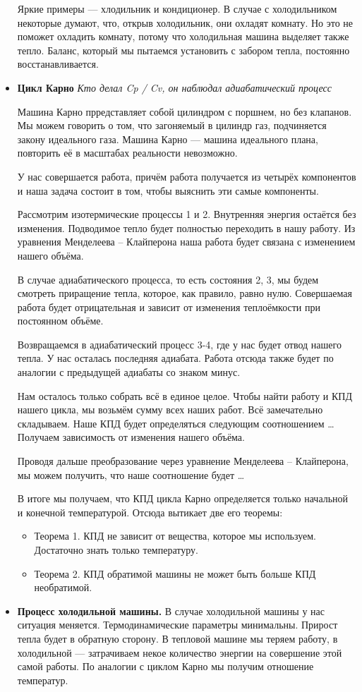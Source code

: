 \documentclass{book}
\begin{document}
\begin{itemize}
    Яркие примеры --- хлодильник и кондиционер. В случае с холодильником некоторые думают, что, открыв холодильник, они охладят комнату. Но это не поможет охладить комнату, потому что холодильная машина выделяет также тепло. Баланс, который мы пытаемся установить с забором тепла, постоянно восстанавливается.

    \item {\bf Цикл Карно} {\it Кто делал Cp / Cv, он наблюдал адиабатический процесс}

    Машина Карно прредставляет собой цилиндром с поршнем, но без клапанов. Мы можем говорить о том, что загоняемый в цилиндр газ, подчиняется закону идеального газа. Машина Карно --- машина идеального плана, повторить её в масштабах реальности невозможно.

    У нас совершается работа, причём работа получается из четырёх компонентов и наша задача состоит в том, чтобы выяснить эти самые компоненты.

    Рассмотрим изотермические процессы 1 и 2. Внутренняя энергия остаётся без изменения. Подводимое тепло будет полностью переходить в нашу работу. Из уравнения Менделеева -- Клайперона наша работа будет связана с изменением нашего объёма.

    В случае адиабатического процесса, то есть состояния 2, 3, мы будем смотреть приращение тепла, которое, как правило, равно нулю. Совершаемая работа будет отрицательная и зависит от изменения теплоёмкости при постоянном объёме.

    Возвращаемся в адиабатический процесс 3-4, где у нас будет отвод нашего тепла. У нас осталась последняя адиабата. Работа отсюда также будет по аналогии с предыдущей адиабаты со знаком минус.

    Нам осталось только собрать всё в единое целое. Чтобы найти работу и КПД нашего цикла, мы возьмём сумму всех наших работ. Всё замечательно складываем. Наше КПД будет определяться следующим соотношением \dots Получаем зависимость от изменения нашего объёма.

    Проводя дальше преобразование через уравнение Менделеева -- Клайперона, мы можем получить, что наше соотношение будет \dots

    В итоге мы получаем, что КПД цикла Карно определяется только начальной и конечной температурой. Отсюда вытикает две его теоремы:
    \begin{itemize}
        \item Теорема 1. КПД не зависит от вещества, которое мы используем. Достаточно знать только температуру.
        \item Теорема 2. КПД обратимой машины не может быть больше КПД необратимой.
    \end{itemize}
    \item {\bf Процесс холодильной машины.} В случае холодильной машины у нас ситуация меняется. Термодинамические параметры минимальны. Прирост тепла будет в обратную сторону. В тепловой машине мы теряем работу, в холодильной --- затрачиваем некое количество энергии на совершение этой самой работы. По аналогии с циклом Карно мы получим отношение температур.
    

\end{itemize}
\end{document}

